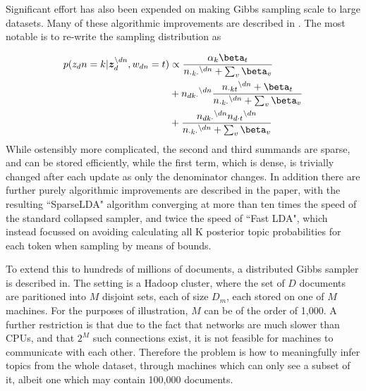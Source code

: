 Significant effort has also been expended on making Gibbs sampling scale to large datasets. Many of these algorithmic improvements are described in \cite{Yao2009}. The most notable is to re-write the sampling distribution as

\newcommand \nodn { { ^{\setminus dn } } }

\begin{align}
\begin{split}
p(z_dn = k | \vv{z}_{d}^{\setminus dn}, w_{dn}=t) & \propto \frac{\alpha_k \beta_t}{n_{\cdot k \cdot}\nodn + \sum_v \beta_v} \\
& + n_{dk\cdot}\nodn \frac{n_{\cdot kt}\nodn + \beta_t}{n_{\cdot k \cdot}\nodn + \sum_v \beta_v} \\
& + \frac{n_{dk\cdot}\nodn n_{d\cdot t}\nodn}{n_{\cdot k \cdot}\nodn + \sum_v \beta_v}
\end{split}
\end{align}
While ostensibly more complicated, the second and third summands are sparse, and can be stored efficiently, while the first term, which is dense, is trivially changed after each update as only the denominator changes. In addition there are further purely algorithmic improvements are described in the paper, with the resulting ``SparseLDA" algorithm converging at more than ten times the speed of the standard collapsed sampler, and twice the speed of ``Fast LDA"\cite{Porteous2008}, which instead focussed on avoiding calculating all K posterior topic probabilities for each token when sampling by means of bounds.


To extend this to hundreds of millions of documents, a distributed Gibbs sampler is described in\cite{Newman2009}. The setting is a Hadoop cluster, where the set of $D$ documents are paritioned into $M$ disjoint sets, each of size $D_m$, each stored on one of $M$ machines. For the purposes of illustration, $M$ can be of the order of 1,000. A further restriction is that due to the fact that networks are much slower than CPUs, and that $2^M$ such connections exist, it is not feasible for machines to communicate with each other. Therefore the problem is how to meaningfully infer topics from the whole dataset, through machines which can only see a subset of it, albeit one which may contain 100,000 documents.

